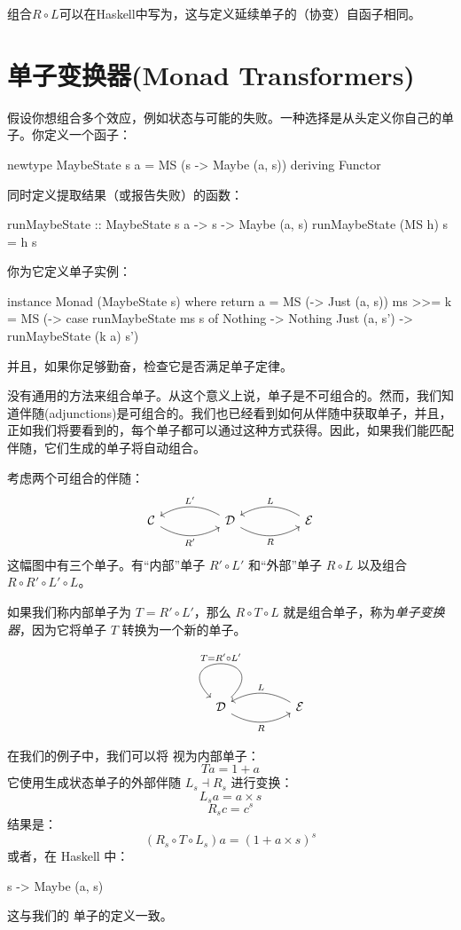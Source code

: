 \documentclass[DaoFP]{subfiles}
\begin{document}
组合$R \circ L$可以在Haskell中写为，这与定义延续单子的（协变）自函子相同。

\section{单子变换器(Monad Transformers)}

假设你想组合多个效应，例如状态与可能的失败。一种选择是从头定义你自己的单子。你定义一个函子：
\begin{haskell}
newtype MaybeState s a = MS (s -> Maybe (a, s))
  deriving Functor
\end{haskell}
同时定义提取结果（或报告失败）的函数：
\begin{haskell}
runMaybeState :: MaybeState s a -> s -> Maybe (a, s)
runMaybeState (MS h) s = h s
\end{haskell}
你为它定义单子实例：
\begin{haskell}
instance Monad (MaybeState s) where
  return a = MS (\s -> Just (a, s))
  ms >>= k = MS (\s -> case runMaybeState ms s of
                       Nothing -> Nothing
                       Just (a, s') -> runMaybeState (k a) s')
\end{haskell}
并且，如果你足够勤奋，检查它是否满足单子定律。

没有通用的方法来组合单子。从这个意义上说，单子是不可组合的。然而，我们知道伴随(adjunctions)是可组合的。我们也已经看到如何从伴随中获取单子，并且，正如我们将要看到的，每个单子都可以通过这种方式获得。因此，如果我们能匹配伴随，它们生成的单子将自动组合。

考虑两个可组合的伴随：
\[
 \begin{tikzcd}
  \mathcal{C}
  \arrow[rr, bend right, "R'"']
  &&
  \mathcal{D}
  \arrow[ll, bend right, "L'"']
    \arrow[rr, bend right, "R"']
&&
  \mathcal{E}
  \arrow[ll, bend right, "L"']
 \end{tikzcd}
\]
这幅图中有三个单子。有“内部”单子 $R' \circ L'$ 和“外部”单子 $R \circ L$ 以及组合 $R \circ R' \circ L' \circ L$。

如果我们称内部单子为 $T = R' \circ L'$，那么 $R \circ T \circ L$ 就是组合单子，称为\emph{单子变换器}，因为它将单子 $T$ 转换为一个新的单子。

\[
 \begin{tikzcd}
   &&
  \mathcal{D}
  \arrow[loop, "T = R' \circ L'"']
    \arrow[rr, bend right, "R"']
&&
  \mathcal{E}
  \arrow[ll, bend right, "L"']
 \end{tikzcd}
\]

在我们的例子中，我们可以将  视为内部单子：
\[ T a = 1 + a \]
它使用生成状态单子的外部伴随 $L_s \dashv R_s$ 进行变换：
\[ L_s a = a \times s \]
\[ R_s c = c^s \]
结果是：
\[ (R_s \circ T \circ L_s) a = (1 + a \times s)^s\]
或者，在 Haskell 中：
\begin{haskell}
s -> Maybe (a, s)
\end{haskell}
这与我们的  单子的定义一致。
\end{document}

